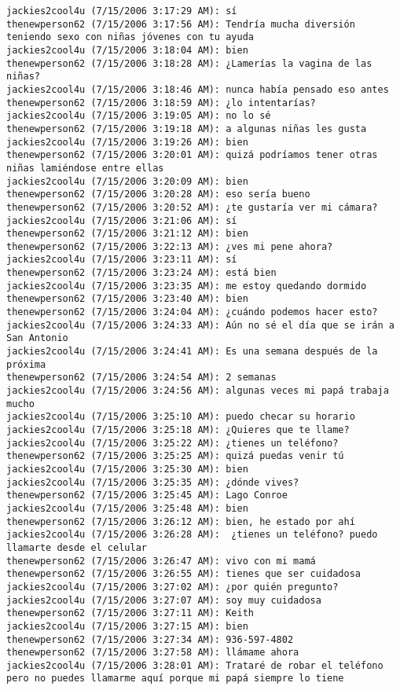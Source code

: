 \begin{verbatim}
jackies2cool4u (7/15/2006 3:17:29 AM): sí
thenewperson62 (7/15/2006 3:17:56 AM): Tendría mucha diversión teniendo sexo con niñas jóvenes con tu ayuda
jackies2cool4u (7/15/2006 3:18:04 AM): bien
thenewperson62 (7/15/2006 3:18:28 AM): ¿Lamerías la vagina de las niñas?
jackies2cool4u (7/15/2006 3:18:46 AM): nunca había pensado eso antes
thenewperson62 (7/15/2006 3:18:59 AM): ¿lo intentarías?
jackies2cool4u (7/15/2006 3:19:05 AM): no lo sé
thenewperson62 (7/15/2006 3:19:18 AM): a algunas niñas les gusta
jackies2cool4u (7/15/2006 3:19:26 AM): bien
thenewperson62 (7/15/2006 3:20:01 AM): quizá podríamos tener otras niñas lamiéndose entre ellas
jackies2cool4u (7/15/2006 3:20:09 AM): bien
thenewperson62 (7/15/2006 3:20:28 AM): eso sería bueno
thenewperson62 (7/15/2006 3:20:52 AM): ¿te gustaría ver mi cámara?
jackies2cool4u (7/15/2006 3:21:06 AM): sí
thenewperson62 (7/15/2006 3:21:12 AM): bien
thenewperson62 (7/15/2006 3:22:13 AM): ¿ves mi pene ahora?
jackies2cool4u (7/15/2006 3:23:11 AM): sí
thenewperson62 (7/15/2006 3:23:24 AM): está bien
jackies2cool4u (7/15/2006 3:23:35 AM): me estoy quedando dormido
thenewperson62 (7/15/2006 3:23:40 AM): bien
thenewperson62 (7/15/2006 3:24:04 AM): ¿cuándo podemos hacer esto?
jackies2cool4u (7/15/2006 3:24:33 AM): Aún no sé el día que se irán a San Antonio
jackies2cool4u (7/15/2006 3:24:41 AM): Es una semana después de la próxima
thenewperson62 (7/15/2006 3:24:54 AM): 2 semanas
jackies2cool4u (7/15/2006 3:24:56 AM): algunas veces mi papá trabaja mucho
jackies2cool4u (7/15/2006 3:25:10 AM): puedo checar su horario
jackies2cool4u (7/15/2006 3:25:18 AM): ¿Quieres que te llame?
jackies2cool4u (7/15/2006 3:25:22 AM): ¿tienes un teléfono?
thenewperson62 (7/15/2006 3:25:25 AM): quizá puedas venir tú
jackies2cool4u (7/15/2006 3:25:30 AM): bien
jackies2cool4u (7/15/2006 3:25:35 AM): ¿dónde vives?
thenewperson62 (7/15/2006 3:25:45 AM): Lago Conroe
jackies2cool4u (7/15/2006 3:25:48 AM): bien
thenewperson62 (7/15/2006 3:26:12 AM): bien, he estado por ahí
jackies2cool4u (7/15/2006 3:26:28 AM):  ¿tienes un teléfono? puedo llamarte desde el celular
thenewperson62 (7/15/2006 3:26:47 AM): vivo con mi mamá
thenewperson62 (7/15/2006 3:26:55 AM): tienes que ser cuidadosa
jackies2cool4u (7/15/2006 3:27:02 AM): ¿por quién pregunto?
jackies2cool4u (7/15/2006 3:27:07 AM): soy muy cuidadosa
thenewperson62 (7/15/2006 3:27:11 AM): Keith
jackies2cool4u (7/15/2006 3:27:15 AM): bien
thenewperson62 (7/15/2006 3:27:34 AM): 936-597-4802
thenewperson62 (7/15/2006 3:27:58 AM): llámame ahora
jackies2cool4u (7/15/2006 3:28:01 AM): Trataré de robar el teléfono pero no puedes llamarme aquí porque mi papá siempre lo tiene

\end{verbatim}
